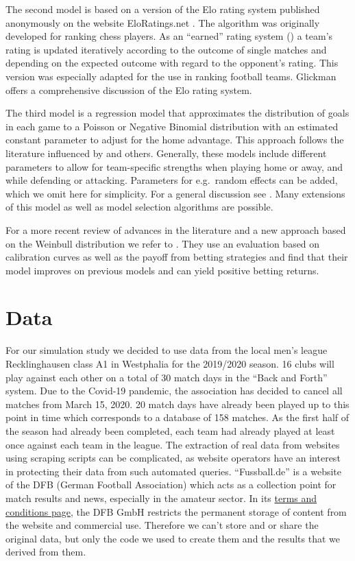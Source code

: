 \documentclass[12pt,a4paper]{article}
\begin{document}
The second model is based on a version of the Elo rating system
published anonymously on the website EloRatings.net
\autocite*{eloratings}. The algorithm was originally developed for
ranking chess players. As an \enquote{earned} rating system
(\textcite{lasek2013}) a team's rating is updated iteratively according
to the outcome of single matches and depending on the expected outcome
with regard to the opponent's rating. This version was especially
adapted for the use in ranking football teams. Glickman
\autocite*{glickman1995} offers a comprehensive discussion of the Elo
rating system.

The third model is a regression model that approximates the distribution
of goals in each game to a Poisson or Negative Binomial distribution
with an estimated constant parameter to adjust for the home advantage.
This approach follows the literature influenced by \textcite{maher1982}
and others. Generally, these models include different parameters to
allow for team-specific strengths when playing home or away, and while
defending or attacking. Parameters for e.g.~random effects can be added,
which we omit here for simplicity. For a general discussion see
\textcite{karlis2003}. Many extensions of this model as well as model
selection algorithms are possible.

For a more recent review of advances in the literature and a new
approach based on the Weinbull distribution we refer to
\textcite{boshnakov2017}. They use an evaluation based on calibration
curves as well as the payoff from betting strategies and find that their
model improves on previous models and can yield positive betting
returns.

\hypertarget{data}{%
\section{Data}\label{data}}

For our simulation study we decided to use data from the local men's
league Recklinghausen class A1 in Westphalia for the 2019/2020 season.
16 clubs will play against each other on a total of 30 match days in the
\enquote{Back and Forth} system. Due to the Covid-19 pandemic, the
association has decided to cancel all matches from March 15, 2020. 20
match days have already been played up to this point in time which
corresponds to a database of 158 matches. As the first half of the
season had already been completed, each team had already played at least
once against each team in the league. The extraction of real data from
websites using scraping scripts can be complicated, as website operators
have an interest in protecting their data from such automated queries.
\enquote{Fussball.de} is a website of the DFB (German Football
Association) which acts as a collection point for match results and
news, especially in the amateur sector. In its
\href{http://www.fussball.de/terms.and.conditions\#!/}{terms and
conditions page}, the DFB GmbH restricts the permanent storage of
content from the website and commercial use. Therefore we can't store
and or share the original data, but only the code we used to create them
and the results that we derived from them.
\end{document}
